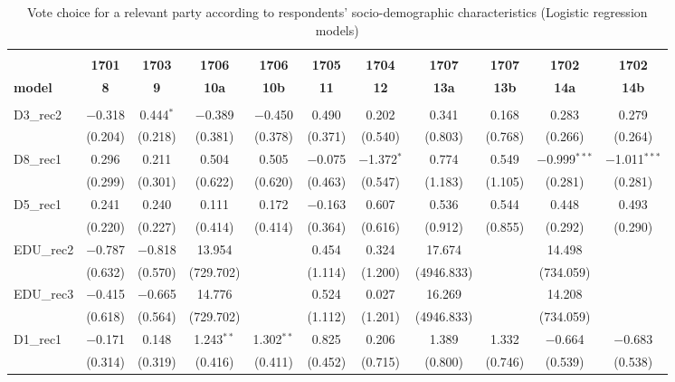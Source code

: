 \documentclass[
]{article}
\begin{document}
\begin{table}[!htbp] \centering 
  \caption{Vote choice for a relevant party according to respondents' 
                       socio-demographic characteristics (Logistic regression models)} 
  \label{table:full_logit_lt} 
\begin{tabular}{@{\extracolsep{5pt}}lcccccccccc} 
\\[-1.8ex]\hline \\[-1.8ex] 
 & \textbf{1701} & \textbf{1703} & \textbf{1706} & \textbf{1706} & \textbf{1705} & \textbf{1704} & \textbf{1707} & \textbf{1707} & \textbf{1702} & \textbf{1702} \\ 
\textbf{model} & \textbf{8} & \textbf{9} & \textbf{10a} & \textbf{10b} & \textbf{11} & \textbf{12} & \textbf{13a} & \textbf{13b} & \textbf{14a} & \textbf{14b}\\ 
\hline \\[-1.8ex] 
 D3\_rec2 & $-$0.318 & 0.444$^{*}$ & $-$0.389 & $-$0.450 & 0.490 & 0.202 & 0.341 & 0.168 & 0.283 & 0.279 \\ 
  & (0.204) & (0.218) & (0.381) & (0.378) & (0.371) & (0.540) & (0.803) & (0.768) & (0.266) & (0.264) \\ 
  D8\_rec1 & 0.296 & 0.211 & 0.504 & 0.505 & $-$0.075 & $-$1.372$^{*}$ & 0.774 & 0.549 & $-$0.999$^{***}$ & $-$1.011$^{***}$ \\ 
  & (0.299) & (0.301) & (0.622) & (0.620) & (0.463) & (0.547) & (1.183) & (1.105) & (0.281) & (0.281) \\ 
  D5\_rec1 & 0.241 & 0.240 & 0.111 & 0.172 & $-$0.163 & 0.607 & 0.536 & 0.544 & 0.448 & 0.493 \\ 
  & (0.220) & (0.227) & (0.414) & (0.414) & (0.364) & (0.616) & (0.912) & (0.855) & (0.292) & (0.290) \\ 
  EDU\_rec2 & $-$0.787 & $-$0.818 & 13.954 &  & 0.454 & 0.324 & 17.674 &  & 14.498 &  \\ 
  & (0.632) & (0.570) & (729.702) &  & (1.114) & (1.200) & (4946.833) &  & (734.059) &  \\ 
  EDU\_rec3 & $-$0.415 & $-$0.665 & 14.776 &  & 0.524 & 0.027 & 16.269 &  & 14.208 &  \\ 
  & (0.618) & (0.564) & (729.702) &  & (1.112) & (1.201) & (4946.833) &  & (734.059) &  \\ 
  D1\_rec1 & $-$0.171 & 0.148 & 1.243$^{**}$ & 1.302$^{**}$ & 0.825 & 0.206 & 1.389 & 1.332 & $-$0.664 & $-$0.683 \\ 
  & (0.314) & (0.319) & (0.416) & (0.411) & (0.452) & (0.715) & (0.800) & (0.746) & (0.539) & (0.538) \\ 

\end{tabular}
\end{table}
\end{document}
